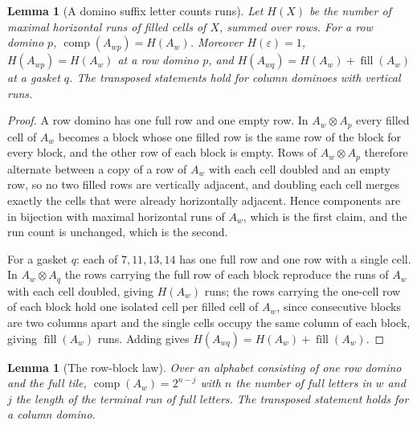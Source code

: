\documentclass[11pt]{amsart}
\newtheorem{lemma}[theorem]{Lemma}
\theoremstyle{definition}
\theoremstyle{remark}
\DeclareMathOperator{\comp}{comp}
\DeclareMathOperator{\fil}{fill}
\begin{document}
\begin{lemma}[A domino suffix letter counts runs]
\label{lem:runs}
Let $H(X)$ be the number of maximal horizontal runs of filled cells of $X$, summed over rows. For a row domino $p$, $\comp(A_{wp}) = H(A_w)$. Moreover $H(\varepsilon) = 1$, $H(A_{wp}) = H(A_w)$ at a row domino $p$, and $H(A_{wq}) = H(A_w) + \fil(A_w)$ at a gasket $q$. The transposed statements hold for column dominoes with vertical runs.
\end{lemma}

\begin{proof}
A row domino has one full row and one empty row. In $A_w \otimes A_p$ every filled cell of $A_w$ becomes a block whose one filled row is the same row of the block for every block, and the other row of each block is empty. Rows of $A_w \otimes A_p$ therefore alternate between a copy of a row of $A_w$ with each cell doubled and an empty row, so no two filled rows are vertically adjacent, and doubling each cell merges exactly the cells that were already horizontally adjacent. Hence components are in bijection with maximal horizontal runs of $A_w$, which is the first claim, and the run count is unchanged, which is the second.

For a gasket $q$: each of $7, 11, 13, 14$ has one full row and one row with a single cell. In $A_w \otimes A_q$ the rows carrying the full row of each block reproduce the runs of $A_w$ with each cell doubled, giving $H(A_w)$ runs; the rows carrying the one-cell row of each block hold one isolated cell per filled cell of $A_w$, since consecutive blocks are two columns apart and the single cells occupy the same column of each block, giving $\fil(A_w)$ runs. Adding gives $H(A_{wq}) = H(A_w) + \fil(A_w)$.
\end{proof}

\begin{lemma}[The row-block law]
\label{lem:block}
Over an alphabet consisting of one row domino and the full tile, $\comp(A_w) = 2^{n-j}$ with $n$ the number of full letters in $w$ and $j$ the length of the terminal run of full letters. The transposed statement holds for a column domino.
\end{lemma}
\end{document}
